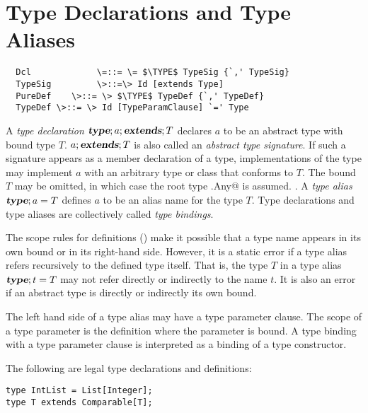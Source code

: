 \documentclass[11pt]{report}
\newcommand{\iffinaltype}[1]{}
\renewcommand{\todo}[1]{}
\begin{document}
\section{Type Declarations and Type Aliases}
\label{sec:typedcl}
\label{sec:typealias}

\syntax\begin{verbatim}
  Dcl             \=::= \= $\TYPE$ TypeSig {`,' TypeSig}
  TypeSig         \>::=\> Id [extends Type]
  PureDef    \>::= \> $\TYPE$ TypeDef {`,' TypeDef}
  TypeDef \>::= \> Id [TypeParamClause] `=' Type
\end{verbatim}

A {\em type declaration} $\mbox{\sl\bfseries type};a ;\mbox{\sl\bfseries extends}; T$ declares $a$ to be an
abstract type with bound type $T$. $a ;\mbox{\sl\bfseries extends}; T$ is also called an
{\em abstract type signature}.  If such a signature appears as a
member declaration of a type, implementations of the type may
implement $a$ with an arbitrary type or class that conforms to
$T$. The bound $T$ may be omitted, in which case the root type
\verb@scala.Any@ is assumed.  \iffinaltype{If the type declaration is
labelled $\FINAL$, implementations of $a$ are required to be leaf
classes (\sref{sec:modifiers})}.  A {\em type alias} $\mbox{\sl\bfseries type};a = T$
defines $a$ to be an alias name for the type $T$. Type declarations
and type aliases are collectively called {\em type bindings}.

The scope rules for definitions () make it possible
that a type name appears in its own bound or in its right-hand side.
However, it is a static error if a type alias refers recursively to
the defined type itself.  That is, the type $T$ in a type alias
$\mbox{\sl\bfseries type};t = T$ may not refer directly or indirectly to the name $t$.
It is also an error if an abstract type is directly or indirectly its
own bound. \todo{Define in terms of base class sequence}

The left hand side of a type alias may have a type parameter clause.
The scope of a type parameter is the definition where the parameter is
bound.
%
%
A type binding with a type parameter
clause is interpreted as a binding of a type constructor.

\example The following are legal type declarations and definitions:
\begin{verbatim}
type IntList = List[Integer];
type T extends Comparable[T];
\end{verbatim}
\end{document}
